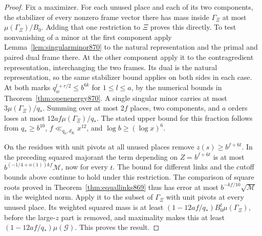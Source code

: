 \documentclass[a4paper,11pt]{article}
\theoremstyle{definition}
\theoremstyle{remark}
\numberwithin{equation}{section}
\begin{document}
\begin{proof}
Fix a maximizer. For each unused place and each of its two
components, the stabilizer of every nonzero frame vector there
has mass inside \(\Gamma_\Xi\) at most \(\mu(\Gamma_\Xi)/B_0\).
Adding that one restriction to \(\Xi\) proves this directly.
To test nonvanishing of a minor at the first component apply
Lemma~\ref{lem:singularminor870} to the natural representation
and the primal and paired dual frame there. At the other
component apply it to the contragredient representation,
interchanging the two frames. Its dual is the natural
representation, so the same stabilizer bound applies on both
sides in each case. At both marks
\(q_w^{l+r/2}\le b^{6k}\) for \(1\le l\le a\), by the numerical
bounds in Theorem~\ref{thm:openenergy870}. A single singular
minor carries at most \(3\mu(\Gamma_\Xi)/q_*\). Summing over
at most \(2f\) places, two components, and \(a\) orders loses
at most \(12af\mu(\Gamma_\Xi)/q_*\). The stated upper bound
for this fraction follows from \(q_*\ge b^{10}\),
\(f\ll_{q_0,d_K}x^{12}\), and \(\log b\ge(\log x)^6\).

On the residues with unit pivots at all unused places remove
\(z(s)\ge b^{f+6t}\). In the preceding squared majorant the
term depending on \(Z=b^{f+6t}\) is at most
\(b^{(-1/4+o(1))kf}\mathcal M\), now for every \(t\).
The bound for different links and the cutoff bounds above
continue to hold under this restriction. The comparison of
square roots proved in Theorem~\ref{thm:equallinks869} thus
has error at most \(b^{-kf/10}\sqrt{\mathcal M}\) in the
weighted norm. Apply it to the subset of \(\Gamma_\Xi\)
with unit pivots at every unused place. Its weighted squared
mass is at least
\((1-12af/q_*)B_0^t\mu(\Gamma_\Xi)\), before the large-\(z\)
part is removed, and maximality makes this at least
\((1-12af/q_*)\mu(\mathcal G)\). This proves the result.
\end{proof}
\end{document}
